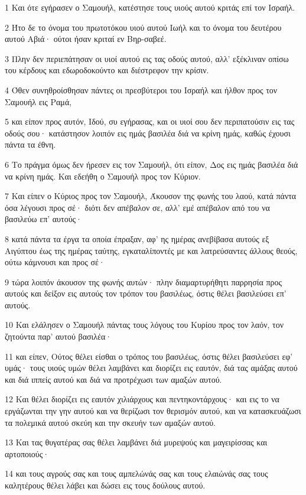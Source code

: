 \par 1 Και ότε εγήρασεν ο Σαμουήλ, κατέστησε τους υιούς αυτού κριτάς επί τον Ισραήλ.
\par 2 Ήτο δε το όνομα του πρωτοτόκου υιού αυτού Ιωήλ και το όνομα του δευτέρου αυτού Αβιά· ούτοι ήσαν κριταί εν Βηρ-σαβεέ.
\par 3 Πλην δεν περιεπάτησαν οι υιοί αυτού εις τας οδούς αυτού, αλλ' εξέκλιναν οπίσω του κέρδους και εδωροδοκούντο και διέστρεφον την κρίσιν.
\par 4 Όθεν συνηθροίσθησαν πάντες οι πρεσβύτεροι του Ισραήλ και ήλθον προς τον Σαμουήλ εις Ραμά,
\par 5 και είπον προς αυτόν, Ιδού, συ εγήρασας, και οι υιοί σου δεν περιπατούσιν εις τας οδούς σου· κατάστησον λοιπόν εις ημάς βασιλέα διά να κρίνη ημάς, καθώς έχουσι πάντα τα έθνη.
\par 6 Το πράγμα όμως δεν ήρεσεν εις τον Σαμουήλ, ότι είπον, Δος εις ημάς βασιλέα διά να κρίνη ημάς. Και εδεήθη ο Σαμουήλ προς τον Κύριον.
\par 7 Και είπεν ο Κύριος προς τον Σαμουήλ, Άκουσον της φωνής του λαού, κατά πάντα όσα λέγουσι προς σέ· διότι δεν απέβαλον σε, αλλ' εμέ απέβαλον από του να βασιλεύω επ' αυτούς·
\par 8 κατά πάντα τα έργα τα οποία έπραξαν, αφ' ης ημέρας ανεβίβασα αυτούς εξ Αιγύπτου έως της ημέρας ταύτης, εγκαταλίποντές με και λατρεύσαντες άλλους θεούς, ούτω κάμνουσι και προς σέ·
\par 9 τώρα λοιπόν άκουσον της φωνής αυτών· πλην διαμαρτυρήθητι παρρησία προς αυτούς και δείξον εις αυτούς τον τρόπον του βασιλέως, όστις θέλει βασιλεύσει επ' αυτούς.
\par 10 Και ελάλησεν ο Σαμουήλ πάντας τους λόγους του Κυρίου προς τον λαόν, τον ζητούντα παρ' αυτού βασιλέα·
\par 11 και είπεν, Ούτος θέλει είσθαι ο τρόπος του βασιλέως, όστις θέλει βασιλεύσει εφ' υμάς· τους υιούς υμών θέλει λαμβάνει και διορίζει εις εαυτόν, διά τας αμάξας αυτού και διά ιππείς αυτού και διά να προτρέχωσι των αμαξών αυτού.
\par 12 Και θέλει διορίζει εις εαυτόν χιλιάρχους και πεντηκοντάρχους· και εις το να εργάζωνται την γην αυτού και να θερίζωσι τον θερισμόν αυτού, και να κατασκευάζωσι τα πολεμικά αυτού σκεύη και την σκευήν των αμαξών αυτού.
\par 13 Και τας θυγατέρας σας θέλει λαμβάνει διά μυρεψούς και μαγειρίσσας και αρτοποιούς·
\par 14 και τους αγρούς σας και τους αμπελώνάς σας και τους ελαιώνάς σας τους καλητέρους θέλει λάβει και δώσει εις τους δούλους αυτού.
